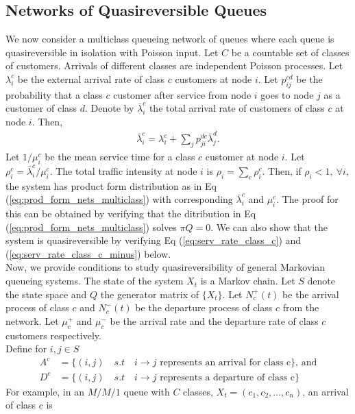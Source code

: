\documentclass[all-lectures.tex]{subfiles}
\begin{document}
\subsection{Networks of Quasireversible Queues}
We now consider a multiclass queueing network of queues where each queue is quasireversible in isolation with Poisson input. Let $C$ be a countable set of classes of customers. Arrivals of different classes are independent Poisson processes. Let $\lambda^c_i$ be the external arrival rate of class $c$ customers at node $i$. Let $p^{cd}_{ij}$ be the probability that a class $c$ customer after service from node $i$ goes to node $j$ as a customer of class $d$. Denote by $\bar{\lambda}^c_i$ the total arrival rate of customers of class $c$ at node $i$. Then,
\begin{align}
\bar{\lambda}^c_i = \lambda^c_i + \sum_{j} p^{dc}_{ji} \bar{\lambda}^d_j.
\end{align}
Let $1/\mu^c_i$ be the mean service time for a class $c$ customer at node $i$. Let $\rho^c_i = \bar{\lambda}^c_i/\mu^c_i$. The total traffic intensity at node $i$ is $\rho_i = \sum_c \rho^c_i$. Then, if $\rho_i < 1, \ \forall i$, the system has product form distribution as in Eq (\ref{eq:prod_form_nets_multiclass}) with corresponding $\bar{\lambda}^c_i$ and $\mu^c_i$. The proof for this can be obtained by verifying that the ditribution in Eq (\ref{eq:prod_form_nets_multiclass}) solves $\pi Q =0$. We can also show that the system is quasireversible by verifying Eq (\ref{eq:serv_rate_class_c}) and (\ref{eq:serv_rate_class_c_minus}) below.\\
\indent Now, we provide conditions to study quasireversibility of general Markovian queueing systems. The state of the system $X_t$ is a Markov chain. Let $S$ denote the state space and $Q$ the generator matrix of $\{X_t\}$. Let $N_c^+ (t)$  be the arrival process of class $c$ and $N_c^-(t)$ be the departure process of class $c$ from the network. Let  $\mu_c^+$ and $\mu_c^-$ be the arrival rate and the departure rate of class $c$ customers respectively. \\ 
\indent Define for $i,j \in S$
\begin{align*}
A^c &= \{(i,j) \quad s.t \quad i \to j \text{ represents an arrival for class c}\} \text{, and} \\
D^c &= \{(i,j) \quad s.t \quad i \to j \text{ represents a departure of class c}\}
\end{align*}
For example, in an $M/M/1$ queue with $C$ classes, $X_t = (c_1, c_2, \dots, c_n)$, an arrival of class $c$ is 
\end{document}
